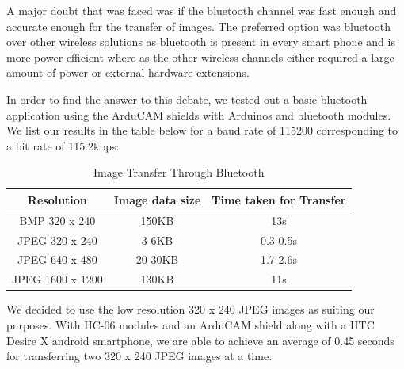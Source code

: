 \documentclass[11pt]{report}
\begin{document}
A major doubt that was faced was if the bluetooth channel was fast enough and accurate enough for the transfer of images. The preferred option was bluetooth over other wireless solutions as bluetooth is present in every smart phone and is more power efficient where as the other wireless channels either required a large amount of power or external hardware extensions.

In order to find the answer to this debate, we tested out a basic bluetooth application using the ArduCAM shields with Arduinos and bluetooth modules. We list our results in the table below for a baud rate of 115200 corresponding to a bit rate of 115.2kbps: 
\newline
\begin{table}[h]
\begin{tabular}{|c|c|c|}
\hline
Resolution & Image data size & Time taken for Transfer\\
\hline
BMP 320 x 240 & 150KB & 13s\\
\hline
JPEG 320 x 240 &	 3-6KB &	0.3-0.5s\\
\hline
JPEG 640 x 480 &	 20-30KB &	1.7-2.6s\\
\hline
JPEG 1600 x 1200 & 	130KB  &  11s\\
\hline

\end{tabular} 
\caption{Image Transfer Through Bluetooth}
\end{table}
\newline

We decided to use the low resolution 320 x 240 JPEG images as suiting our purposes. With HC-06 modules and an ArduCAM shield along with a HTC Desire X android smartphone, we are able to achieve an average of 0.45 seconds for transferring two 320 x 240 JPEG images at a time.      



\end{document}
